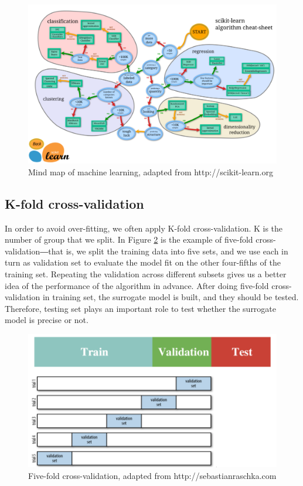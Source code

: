 \begin{figure}[h]
	\flushleft
	\includegraphics[width=1.15\textwidth]{images/scikit.png}
	\begin{flushleft}
		\caption{Mind map of machine learning, adapted from http://scikit-learn.org}
	\end{flushleft}
	\label{Mind map of machine learning}
\end{figure}

\subsection{K-fold cross-validation}

In order to avoid over-fitting, we often apply K-fold cross-validation. K is the number of group that we split. In Figure \ref{Five-fold cross-validation} is the example of five-fold cross-validation―that is, we split the training data into five sets, and we use each in turn as validation set to evaluate the model fit on the other four-fifths of the training set. Repeating the validation across different subsets gives us a better idea of the performance of the algorithm in advance. After doing five-fold cross-validation in training set, the surrogate model is built, and they should be tested. Therefore, testing set plays an important role to test whether the surrogate model is precise or not. 

\begin{figure}[h]
	\flushleft
	\includegraphics[width=1\textwidth]{images/5fold.png}
	\caption{Five-fold cross-validation, adapted from http://sebastianraschka.com}
	\label{Five-fold cross-validation}
\end{figure}

